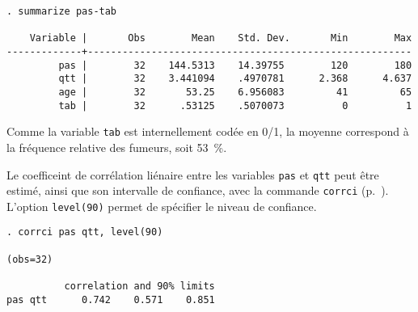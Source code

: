 \begin{verbatim}
. summarize pas-tab

    Variable |       Obs        Mean    Std. Dev.       Min        Max
-------------+--------------------------------------------------------
         pas |        32    144.5313    14.39755        120        180
         qtt |        32    3.441094    .4970781      2.368      4.637
         age |        32       53.25    6.956083         41         65
         tab |        32      .53125    .5070073          0          1
\end{verbatim}
Comme la variable \texttt{tab} est internellement codée en 0/1, la moyenne
correspond à la fréquence relative des fumeurs, soit 53~\%.

Le coefficeint de corrélation liénaire entre les variables \texttt{pas} et
\texttt{qtt} peut être estimé, ainsi que son intervalle de confiance, avec
la commande \texttt{corrci} (p.~\pageref{cmd:corrci}). L'option
\texttt{level(90)} permet de spécifier le niveau de confiance.
\begin{verbatim}
. corrci pas qtt, level(90)

(obs=32)

          correlation and 90% limits
pas qtt      0.742    0.571    0.851
\end{verbatim}

